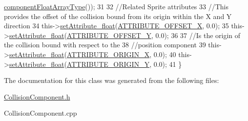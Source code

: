 \begin{DoxyCode}
      \hyperlink{_abstract_component_8h_a55cf170262c3d7123f8b95208293e36d}{componentFloatArrayType}());
31 
32     \textcolor{comment}{//Related Sprite attributes}
33     \textcolor{comment}{//This provides the offset of the collision bound from its origin within the X and Y direction}
34     this->\hyperlink{class_abstract_component_aadaf9dfbb371db5fb21f9c7cf2cbea98}{setAttribute\_float}(\hyperlink{_a_e___attributes_8h_aa003b6ad3f43053c9d43e1acc0098691}{ATTRIBUTE\_OFFSET\_X}, 0.0);
35     this->\hyperlink{class_abstract_component_aadaf9dfbb371db5fb21f9c7cf2cbea98}{setAttribute\_float}(\hyperlink{_a_e___attributes_8h_a8ebf91b8ee9dfdfad18bc10c3c42d564}{ATTRIBUTE\_OFFSET\_Y}, 0.0);
36 
37     \textcolor{comment}{//Is the origin of the collision bound with respect to the}
38       \textcolor{comment}{//position component}
39     this->\hyperlink{class_abstract_component_aadaf9dfbb371db5fb21f9c7cf2cbea98}{setAttribute\_float}(\hyperlink{_a_e___attributes_8h_a5c5a5ae3ea4130db3dfd08029a17a17c}{ATTRIBUTE\_ORIGIN\_X}, 0.0);
40     this->\hyperlink{class_abstract_component_aadaf9dfbb371db5fb21f9c7cf2cbea98}{setAttribute\_float}(\hyperlink{_a_e___attributes_8h_af45315d7cdc2f4ecdb28d0a9d6bb15c7}{ATTRIBUTE\_ORIGIN\_Y}, 0.0);
41 
\}
\end{DoxyCode}


The documentation for this class was generated from the following files\-:\begin{DoxyCompactItemize}
\item 
\hyperlink{_collision_component_8h}{Collision\-Component.\-h}\item 
Collision\-Component.\-cpp\end{DoxyCompactItemize}
